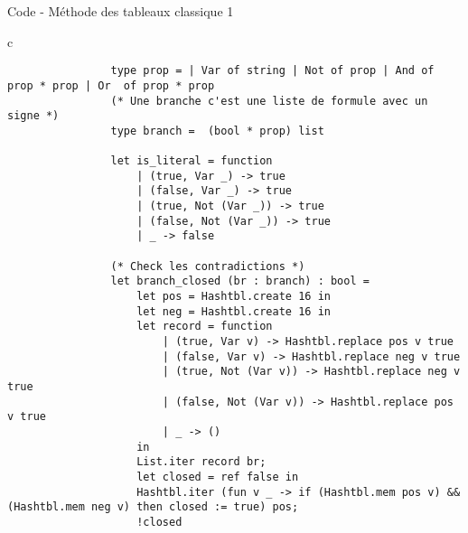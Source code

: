\documentclass[]{beamer}
\begin{document}
\begin{frame}[fragile]{Code - Méthode des tableaux classique 1}
    \begin{center}
        \begin{tabular}{c}
            \begin{lstlisting}
                type prop = | Var of string | Not of prop | And of prop * prop | Or  of prop * prop
                (* Une branche c'est une liste de formule avec un signe *)
                type branch =  (bool * prop) list

                let is_literal = function
                    | (true, Var _) -> true
                    | (false, Var _) -> true
                    | (true, Not (Var _)) -> true
                    | (false, Not (Var _)) -> true
                    | _ -> false
            
                (* Check les contradictions *)
                let branch_closed (br : branch) : bool =
                    let pos = Hashtbl.create 16 in
                    let neg = Hashtbl.create 16 in
                    let record = function
                        | (true, Var v) -> Hashtbl.replace pos v true
                        | (false, Var v) -> Hashtbl.replace neg v true
                        | (true, Not (Var v)) -> Hashtbl.replace neg v true
                        | (false, Not (Var v)) -> Hashtbl.replace pos v true
                        | _ -> ()
                    in
                    List.iter record br;
                    let closed = ref false in
                    Hashtbl.iter (fun v _ -> if (Hashtbl.mem pos v) && (Hashtbl.mem neg v) then closed := true) pos;
                    !closed
            \end{lstlisting}
        \end{tabular}
      \end{center}
\end{frame}
\end{document}
